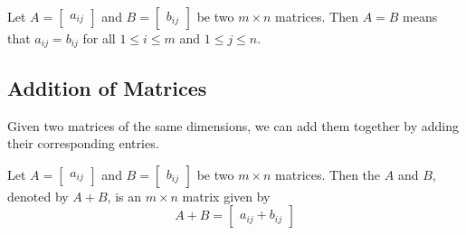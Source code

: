 \documentclass{ximera}
\begin{document}
\begin{definition}\label{def:equalityofmatrices}
 Let $A=\begin{bmatrix} a_{ij}\end{bmatrix}$ and $B=\begin{bmatrix} b_{ij}\end{bmatrix}$ be two $m \times n$ matrices. Then $A=B$ means
that $a_{ij}=b_{ij}$ for all $1\leq i\leq m$ and 
$1\leq j\leq n$.
\end{definition}

\subsection*{Addition of Matrices}

Given two matrices of the same dimensions, we can add them together by adding their corresponding entries.

\begin{definition}\label{def:additionofmatrices}
Let $A=\begin{bmatrix} a_{ij}\end{bmatrix} $ and $B=\begin{bmatrix} b_{ij}\end{bmatrix}$ be two
$m\times n$ matrices. Then the  $A$ and $B$, denoted by $A+B$,  is an $m \times n$
matrix  given by 
$$A+B=\begin{bmatrix}a_{ij}+b_{ij}\end{bmatrix}$$

\end{definition}
\end{document}
